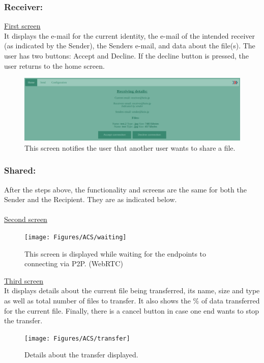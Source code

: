 \subsubsection*{Receiver:}
%
\noindent
\underline{First screen}\\
	It displays the e-mail for the current identity, the e-mail of the intended receiver (as indicated by the Sender), the Senders e-mail, and data about the file(s). The user has two buttons: Accept and Decline. If the decline button is pressed, the user returns to the home screen.
\begin{figure}[H]
	\centering
	\includegraphics[width=\textwidth]{Figures/ACS/receiving}
	\decoRule
	\caption[Connection request screen]{This screen notifies the user that another user wants to share a file.}
  \label{fig:ACS_rec}
\end{figure}
%
\subsubsection*{Shared:}
After the steps above, the functionality and screens are the same for both the Sender and the Recipient. They are as indicated below.\\
\\
%
\noindent
\underline{Second screen}
\begin{figure}[H]
  \centering
  \texttt{[image: Figures/ACS/waiting]}
  \decoRule
  \caption[Waiting screen]{This screen is displayed while waiting for the endpoints to connecting via P2P. (WebRTC)}
  \label{fig:ACS_wait}
\end{figure}

%
\noindent
\underline{Third screen}\\
	It displays details about the current file being transferred, its name, size and type as well as total number of files to transfer. It also shows the \% of data transferred for the current file. Finally, there is a cancel button in case one end wants to stop the transfer.
\begin{figure}[H]
  \centering
  \texttt{[image: Figures/ACS/transfer]}
  \decoRule
  \caption[Transfer screen]{Details about the transfer displayed. }
  \label{fig:ACS_trans}
\end{figure}

